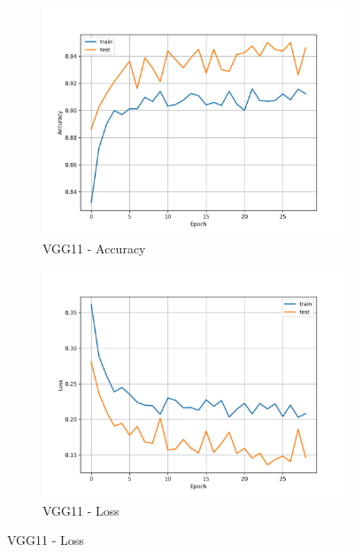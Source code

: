 \documentclass[11pt]{article}
\begin{document}
	\begin{figure}[H]
		\centering
		\caption{Training and Validation Accuracy and Loss Curves}
		
		\vspace{-1em}
		
		\begin{subfigure}[b]{0.49\textwidth}
			\centering
			\includegraphics[width=\linewidth, trim=20 10 20 10, clip]{assets/accuracy_curve/vgg11_accuracy_curve.png}
			\caption{VGG11 - Accuracy}
		\end{subfigure}
		\hfill
		\begin{subfigure}[b]{0.49\textwidth}
			\centering
			\includegraphics[width=\linewidth, trim=20 10 20 10, clip]{assets/loss_curve/vgg11_loss_curve.png}
			\caption{VGG11 - Loss}
		\end{subfigure}
		

\end{figure}
\end{document}
